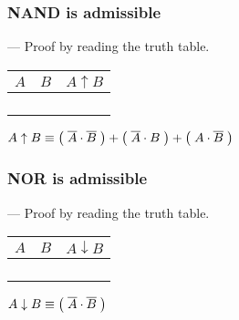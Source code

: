 \begin{frame}

\frametitle{NAND is admissible}

\begin{flushright}
--- Proof by reading the truth table.
\end{flushright}

\vspace{\fill}

\begin{center}

\begin{tabular}{cc|>{\centering\arraybackslash}p{0.4in}}
$A$ & $B$ & $A \uparrow B$ \\\hline
\bz{} & \bz{} & \bo{} \\
\bz{} & \bo{} & \bo{} \\
\bo{} & \bz{} & \bo{} \\
\bo{} & \bo{} & \bz{}
\end{tabular}

\vspace{\fill}

$A \uparrow B \equiv  \mathopen{}\left(\mathrel{}\overline{A} \cdot \overline{B}\mathrel{}\right)\mathclose{}  +  \mathopen{}\left(\mathrel{}\overline{A} \cdot B\mathrel{}\right)\mathclose{}  +  \mathopen{}\left(\mathrel{}A \cdot \overline{B}\mathrel{}\right)\mathclose{} $

\vspace{\fill}

\end{center}

\end{frame}


\begin{frame}

\frametitle{NOR is admissible}

\begin{flushright}
--- Proof by reading the truth table.
\end{flushright}

\vspace{\fill}

\begin{center}

\begin{tabular}{cc|>{\centering\arraybackslash}p{0.4in}}
$A$ & $B$ & $A \downarrow B$ \\\hline
\bz{} & \bz{} & \bo{} \\
\bz{} & \bo{} & \bz{} \\
\bo{} & \bz{} & \bz{} \\
\bo{} & \bo{} & \bz{}
\end{tabular}

\vspace{\fill}

$A \downarrow B \equiv  \mathopen{}\left(\mathrel{}\overline{A} \cdot \overline{B}\mathrel{}\right)\mathclose{} $

\vspace{\fill}

\end{center}

\end{frame}
